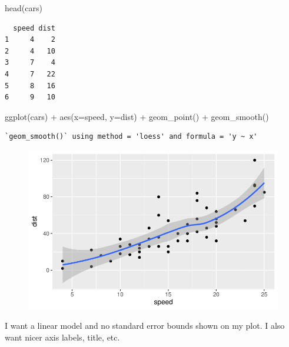 \documentclass[
  letterpaper,
  DIV=11,
  numbers=noendperiod]{scrartcl}
\newenvironment{Shaded}{\begin{snugshade}}{\end{snugshade}}
\newcommand{\AttributeTok}[1]{\textcolor[rgb]{0.40,0.45,0.13}{#1}}
\newcommand{\FunctionTok}[1]{\textcolor[rgb]{0.28,0.35,0.67}{#1}}
\newcommand{\NormalTok}[1]{\textcolor[rgb]{0.00,0.23,0.31}{#1}}
\newcommand{\SpecialCharTok}[1]{\textcolor[rgb]{0.37,0.37,0.37}{#1}}
\begin{document}
\begin{Shaded}
\begin{Highlighting}[]
\FunctionTok{head}\NormalTok{(cars)}
\end{Highlighting}
\end{Shaded}

\begin{verbatim}
  speed dist
1     4    2
2     4   10
3     7    4
4     7   22
5     8   16
6     9   10
\end{verbatim}

\begin{Shaded}
\begin{Highlighting}[]
\FunctionTok{ggplot}\NormalTok{(cars) }\SpecialCharTok{+}
  \FunctionTok{aes}\NormalTok{(}\AttributeTok{x=}\NormalTok{speed, }\AttributeTok{y=}\NormalTok{dist) }\SpecialCharTok{+}
  \FunctionTok{geom\_point}\NormalTok{() }\SpecialCharTok{+}
  \FunctionTok{geom\_smooth}\NormalTok{()}
\end{Highlighting}
\end{Shaded}

\begin{verbatim}
`geom_smooth()` using method = 'loess' and formula = 'y ~ x'
\end{verbatim}

\begin{figure}[H]

{\centering \includegraphics{Class05_files/figure-pdf/unnamed-chunk-6-1.pdf}

}

\end{figure}

I want a linear model and no standard error bounds shown on my plot. I
also want nicer axis labels, title, etc.
\end{document}
